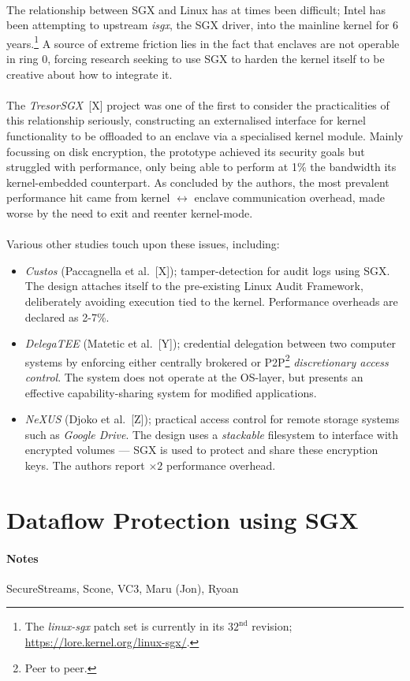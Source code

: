 \paragraph{} The relationship between SGX and Linux has at times been difficult; Intel has been attempting to upstream \textit{isgx}, the SGX driver, into the mainline kernel for 6 years.\footnote{The \textit{linux-sgx} patch set is currently in its $32^{\text{nd}}$ revision; \url{https://lore.kernel.org/linux-sgx/}.} A source of extreme friction lies in the fact that enclaves are not operable in ring 0, forcing research seeking to use SGX to harden the kernel itself to be creative about how to integrate it.

\paragraph{} The \textit{TresorSGX}~[X] project was one of the first to consider the practicalities of this relationship seriously, constructing an externalised interface for kernel functionality to be offloaded to an enclave via a specialised kernel module. Mainly focussing on disk encryption, the prototype achieved its security goals but struggled with performance, only being able to perform at 1\% the bandwidth its kernel-embedded counterpart. As concluded by the authors, the most prevalent performance hit came from kernel $\leftrightarrow$ enclave communication overhead, made worse by the need to exit and reenter kernel-mode.


\paragraph{} Various other studies touch upon these issues, including:

\begin{itemize}
    \item \textit{Custos} (Paccagnella et al.~[X]); tamper-detection for audit logs using SGX. The design attaches itself to the pre-existing Linux Audit Framework, deliberately avoiding execution tied to the kernel. Performance overheads are declared as 2-7\%. 
    \item \textit{DelegaTEE} (Matetic et al.~[Y]); credential delegation between two computer systems by enforcing either centrally brokered or P2P\footnote{Peer to peer.} \textit{discretionary access control}. The system does not operate at the OS-layer, but presents an effective capability-sharing system for modified applications.
    \item \textit{NeXUS} (Djoko et al.~[Z]); practical access control for remote storage systems such as \textit{Google Drive}. The design uses a \textit{stackable} filesystem to interface with encrypted volumes --- SGX is used to protect and share these encryption keys. The authors report $\times 2$ performance overhead.
\end{itemize}


\section{Dataflow Protection using SGX}




\paragraph{Notes} SecureStreams, Scone, VC3, Maru (Jon), Ryoan

